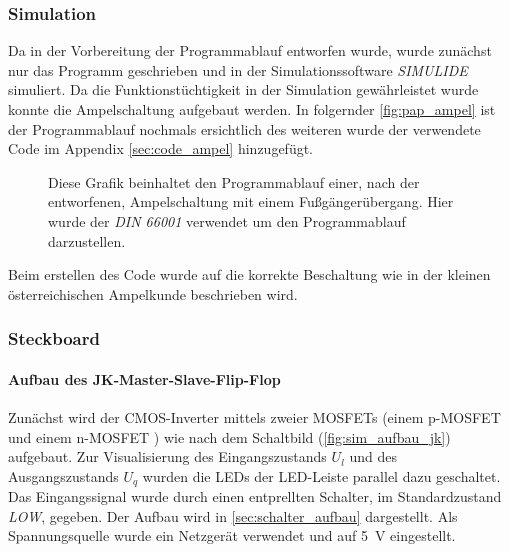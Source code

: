 \documentclass[12pt,english,ngerman]{scrartcl}
\begin{document}
\subsubsection{Simulation}

Da in der Vorbereitung der Programmablauf entworfen wurde, wurde
zunächst nur das Programm geschrieben und in der Simulationssoftware
\textit{SIMULIDE} simuliert. Da die Funktionstüchtigkeit in der
Simulation gewährleistet wurde konnte die Ampelschaltung aufgebaut
werden. In folgernder \autoref{fig:pap_ampel} ist der Programmablauf
nochmals ersichtlich des weiteren wurde der verwendete Code im Appendix
\ref{sec:code_ampel} hinzugefügt.

\begin{figure}[H]
  \centering
    \caption{Diese Grafik beinhaltet den Programmablauf einer, nach der
       entworfenen, Ampelschaltung mit
      einem Fußgängerübergang. Hier wurde der \textit{DIN 66001}
      verwendet um den Programmablauf darzustellen. }
  \label{fig:pap_ampel}
\end{figure}

Beim erstellen des Code wurde auf die korrekte Beschaltung wie in der
kleinen österreichischen Ampelkunde beschrieben wird.

\subsubsection{Steckboard}
\paragraph{Aufbau des JK-Master-Slave-Flip-Flop}\label{sec:mess_cmos}
Zunächst wird der CMOS-Inverter mittels zweier MOSFETs (einem p-MOSFET \cite{ZVP2106A} und
einem n-MOSFET \cite{ZVN2106A}) wie nach dem Schaltbild (\autoref{fig:sim_aufbau_jk})
aufgebaut. Zur Visualisierung des Eingangszustands $U_l$ und des
Ausgangszustands $U_q$ wurden die LEDs der LED-Leiste parallel dazu geschaltet. Das
Eingangssignal wurde durch einen entprellten Schalter, im Standardzustand
\textit{LOW}, gegeben. Der Aufbau wird in \autoref{sec:schalter_aufbau} dargestellt. Als
Spannungsquelle wurde ein Netzgerät verwendet und auf \SI{5}{\volt}
eingestellt. 
\end{document}

